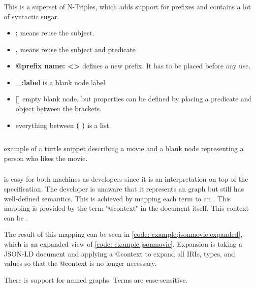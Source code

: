 \subsubsection{}
This is a superset of N-Triples, which adds support for prefixes and contains a lot of syntactic sugar. 
\begin{itemize}

    \item \textbf{;} means reuse the subject.
    \item \textbf{,} means reuse the subject and predicate
    \item \textbf{@prefix name: <>} defines a new prefix. It has to be placed before any use.
    \item \textbf{\_:label} is a blank node label
    \item \textbf{[]} empty blank node, but properties can be defined by placing a predicate and object between the brackets.
    \item everything between \textbf{( )} is a list.
    
\end{itemize}
\begin{listing}[H]
    \inputminted[linenos,frame=single]{Turtle}{code/example_turtle.ttl}
    \caption{example of a turtle snippet describing a movie and a blank node representing a person who likes the movie.}
    \label{code:example:turtle}
\end{listing}
\subsubsection{}
 is easy for both machines as developers since it is an interpretation on top of the  specification. The developer is unaware that it represents an  graph but still has well-defined semantics. This is achieved by mapping each term to an . This mapping is provided by the term "@context" in the document itself. This context can be . 

The result of this mapping can be seen in \autoref{code: example:jsonmovie:expanded}, which is an expanded view of \autoref{code: example:jsonmovie}. Expansion is taking a JSON-LD document and applying a @context to expand all IRIs, types, and values so that the @context is no longer necessary. 

There is support for named graphs.
Terms are case-sensitive. 


